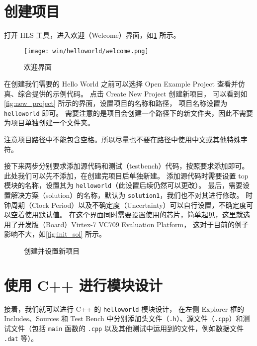 \documentclass[Chinese,TC,use boldface,simple Names]{beaulivre}
\begin{document}
  \section{创建项目}

    打开 HLS 工具，进入欢迎（Welcome）界面，如\cref{fig:welcome} 所示。
    \begin{figure}[htbp]
      \centering
      \texttt{[image: win/helloworld/welcome.png]}
      \caption{欢迎界面}
      \label{fig:welcome}
    \end{figure}
    在创建我们需要的 Hello World 之前可以选择
    Open Example Project 查看并仿真、综合提供的示例代码。
    点击 Create New Project 创建新项目，
    可以看到如\cref{fig:new_project} 所示的界面，设置项目的名称和路径，
    项目名称设置为 \texttt{helloworld} 即可。
    需要注意的是项目会创建一个路径下的新文件夹，因此不需要为项目单独创建一个文件夹。
    \begin{warning}
      注意项目路径中不能包含空格。所以尽量也不要在路径中使用中文或其他特殊字符。
    \end{warning}

    接下来两步分别要求添加源代码和测试（testbench）代码，按照要求添加即可。
    此处我们可以先不添加，在创建完项目后单独新建。
    添加源代码时需要设置 top 模块的名称，设置其为 \texttt{helloworld}（此设置后续仍然可以更改）。
    最后，需要设置解决方案（solution）的名称，默认为 \texttt{solution1}，我们也不对其进行修改。
    时钟周期（Clock Period）以及不确定度（Uncertainty）可以自行设置，不确定度可以空着使用默认值。
    在这个界面同时需要设置使用的芯片，简单起见，这里就选用了开发版（Board）Virtex-7 VC709 Evaluation Platform，
    这对于目前的例子影响不大，如\cref{fig:init_sol} 所示。
    \begin{figure}[h!]
      \centering
      \quad
      \caption{创建并设置新项目}
    \end{figure}

  \section{使用 C++ 进行模块设计}

    接着，我们就可以进行 C++ 的 \texttt{helloworld} 模块设计，
    在左侧 Explorer 框的 Includes、Sources 和 Test Bench 中分别添加头文件（\texttt{.h}）、源文件（\texttt{.cpp}）和测试文件（包括 \texttt{main} 函数的 \texttt{.cpp} 以及其他测试中运用到的文件，例如数据文件 \texttt{.dat} 等）。
    
\end{document}
